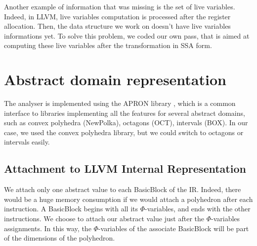 \documentclass[a4paper,english,titlepage,11pt]{report}
\begin{document}
Another example of information that was missing is the set of live variables.
Indeed, in LLVM, live variables computation is processed after the register
allocation. Then, the data structure we work on doesn't have live variables
informations yet. To solve this problem, we coded our own pass, that is aimed at
computing these live variables after the transformation in SSA form.

 \section{Abstract domain representation}

	The analyser is implemented using the APRON library \cite{JM09}, which
	is a common interface to libraries implementing all the features
	for several abstract domains, such as convex polyhedra (NewPolka), 
	octagons (OCT), intervals (BOX).
	In our case, we used the convex polyhedra library, but we could switch
	to octagons or intervals easily.

	\subsection{Attachment to LLVM Internal Representation}

	We attach only one abstract value to each BasicBlock of the IR. Indeed,
	there would be a huge memory consumption if we would attach a polyhedron
	after each instruction. A BasicBlock begins with all its $\Phi$-variables,
	and ends with the other instructions. We choose to attach our abstract value
	just after the $\Phi$-variables assignments. In this way, the
	$\Phi$-variables of the associate BasicBlock will be part of the dimensions
	of the polyhedron.
\end{document}
